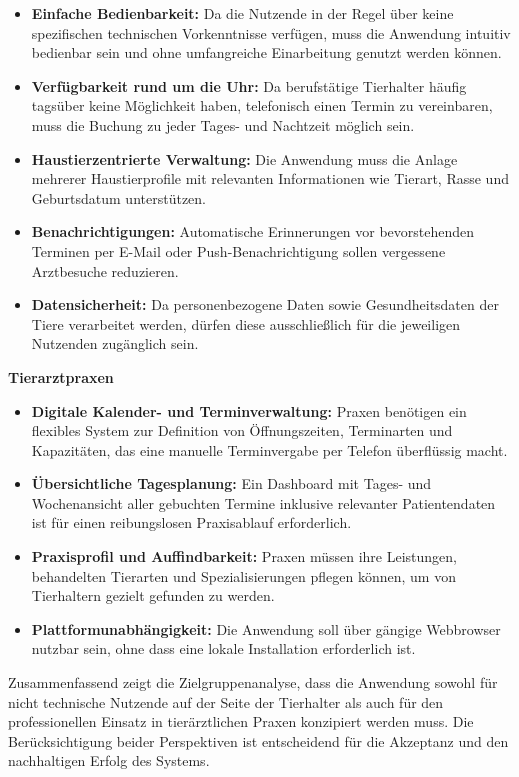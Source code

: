 \begin{itemize}
    \item \textbf{Einfache Bedienbarkeit:} Da die Nutzende in der Regel über keine spezifischen technischen Vorkenntnisse verfügen, muss die Anwendung intuitiv bedienbar sein und ohne umfangreiche Einarbeitung genutzt werden können.
    \item \textbf{Verfügbarkeit rund um die Uhr:} Da berufstätige Tierhalter häufig tagsüber keine Möglichkeit haben, telefonisch einen Termin zu vereinbaren, muss die Buchung zu jeder Tages- und Nachtzeit möglich sein.
    \item \textbf{Haustierzentrierte Verwaltung:} Die Anwendung muss die Anlage mehrerer Haustierprofile mit relevanten Informationen wie Tierart, Rasse und Geburtsdatum unterstützen.
    \item \textbf{Benachrichtigungen:} Automatische Erinnerungen vor bevorstehenden Terminen per E-Mail oder Push-Benachrichtigung sollen vergessene Arztbesuche reduzieren.
    \item \textbf{Datensicherheit:} Da personenbezogene Daten sowie Gesundheitsdaten der Tiere verarbeitet werden, dürfen diese ausschließlich für die jeweiligen Nutzenden zugänglich sein.
\end{itemize}

\textbf{Tierarztpraxen}

\begin{itemize}
    \item \textbf{Digitale Kalender- und Terminverwaltung:} Praxen benötigen ein flexibles System zur Definition von Öffnungszeiten, Terminarten und Kapazitäten, das eine manuelle Terminvergabe per Telefon überflüssig macht.
    \item \textbf{Übersichtliche Tagesplanung:} Ein Dashboard mit Tages- und Wochenansicht aller gebuchten Termine inklusive relevanter Patientendaten ist für einen reibungslosen Praxisablauf erforderlich.
    \item \textbf{Praxisprofil und Auffindbarkeit:} Praxen müssen ihre Leistungen, behandelten Tierarten und Spezialisierungen pflegen können, um von Tierhaltern gezielt gefunden zu werden.
    \item \textbf{Plattformunabhängigkeit:} Die Anwendung soll über gängige Webbrowser nutzbar sein, ohne dass eine lokale Installation erforderlich ist.
\end{itemize}

Zusammenfassend zeigt die Zielgruppenanalyse, dass die Anwendung sowohl für nicht technische Nutzende auf der Seite der Tierhalter als auch für den professionellen Einsatz in tierärztlichen Praxen konzipiert werden muss. Die Berücksichtigung beider Perspektiven ist entscheidend für die Akzeptanz und den nachhaltigen Erfolg des Systems.


